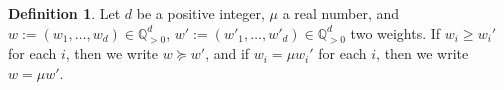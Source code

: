 \documentclass[11pt]{amsart}
\numberwithin{equation}{section}
\newcommand\han[1]{\todo[color=yellow!40]{#1}} %
\newcommand{\Cc}{\mathbb{C}}
\newcommand{\Qq}{\mathbb{Q}}
\newcommand{\Rr}{\mathbb{R}}
\newcommand{\mult}{\operatorname{mult}}
\newtheorem{lem}[thm]{Lemma}
\theoremstyle{definition}
\theoremstyle{definition}
\newtheorem{defn}[thm]{Definition}
\begin{document}

\begin{defn}\label{defn: compare two weights}
Let $d$ be a positive integer, $\mu$ a real number, and $w:=(w_1,\dots,w_d)\in\mathbb Q^d_{>0}$, $w':=(w'_1,\dots,w'_d)\in\mathbb Q^d_{>0}$ two weights. If $w_i\geq w_i'$ for each $i$, then we write $w\succeq w'$, and if $w_i=\mu w_i'$ for each $i$, then we write $w=\mu w'$.
\end{defn}



\end{document}
